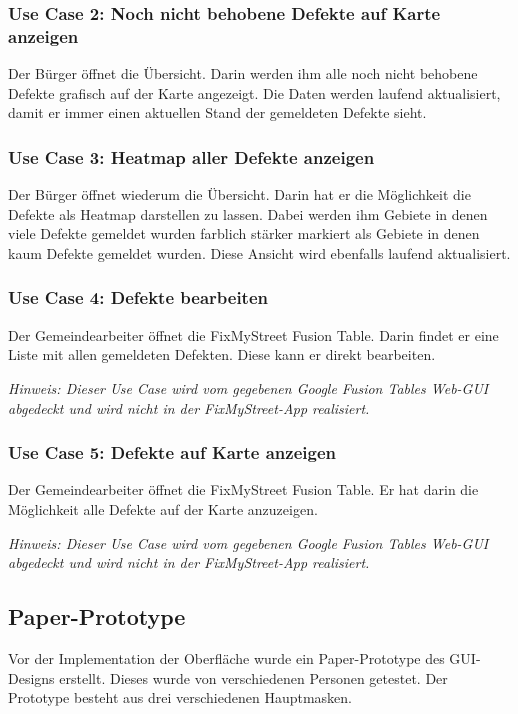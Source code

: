 \subsubsection{Use Case 2: Noch nicht behobene Defekte auf Karte anzeigen}
Der Bürger öffnet die Übersicht. Darin werden ihm alle noch nicht behobene Defekte grafisch auf der Karte angezeigt. Die Daten werden laufend aktualisiert, damit er immer einen aktuellen Stand der gemeldeten Defekte sieht.

\subsubsection{Use Case 3: Heatmap aller Defekte anzeigen}
Der Bürger öffnet wiederum die Übersicht. Darin hat er die Möglichkeit die Defekte als Heatmap darstellen zu lassen. Dabei werden ihm Gebiete in denen viele Defekte gemeldet wurden farblich stärker markiert als Gebiete in denen kaum Defekte gemeldet wurden. Diese Ansicht wird ebenfalls laufend aktualisiert. 

\subsubsection{Use Case 4: Defekte bearbeiten}
Der Gemeindearbeiter öffnet die FixMyStreet Fusion Table. Darin findet er eine Liste mit allen gemeldeten Defekten. Diese kann er direkt bearbeiten.

\emph{Hinweis: Dieser Use Case wird vom gegebenen Google Fusion Tables Web-GUI abgedeckt und wird nicht in der FixMyStreet-App realisiert.}

\subsubsection{Use Case 5: Defekte auf Karte anzeigen}
Der Gemeindearbeiter öffnet die FixMyStreet Fusion Table. Er hat darin die Möglichkeit alle Defekte auf der Karte anzuzeigen.

\emph{Hinweis: Dieser Use Case wird vom gegebenen Google Fusion Tables Web-GUI abgedeckt und wird nicht in der FixMyStreet-App realisiert.}

\subsection{Paper-Prototype}
Vor der Implementation der Oberfläche wurde ein Paper-Prototype des GUI-Designs erstellt. Dieses wurde von verschiedenen Personen getestet. Der Prototype besteht aus drei verschiedenen Hauptmasken.

